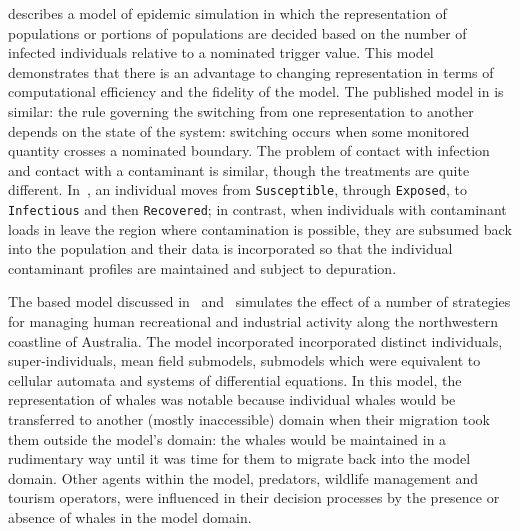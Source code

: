 \Cite{bobashev2007hybrid} describes a model of epidemic simulation in
which the representation of populations or portions of populations are
decided based on the number of infected individuals relative to a
nominated trigger value. This model demonstrates that there is an
advantage to changing representation in terms of computational
efficiency and the fidelity of the model. The published model in
\Ctwo is similar: the rule governing the
switching from one representation to another depends on the state of
the system: switching occurs when some monitored quantity crosses a
nominated boundary. The problem of contact with infection and contact
with a contaminant is similar, though the treatments are quite
different. In~\citet{bobashev2007hybrid}, an individual moves
from \texttt{Susceptible}, through \texttt{Exposed},
to \texttt{Infectious} and then \texttt{Recovered}; in contrast, when
individuals with contaminant loads in \Ctwo
leave the region where contamination is possible, they are subsumed
back into the population and their data is incorporated so that the
individual contaminant profiles are maintained and subject to
depuration.

The \InVitro based model discussed in~\cite{gray2014}
and~\cite{fulton2009crossingscales} simulates the effect of a number
of strategies for managing human recreational and industrial activity
along the northwestern coastline of Australia. The model incorporated
incorporated distinct individuals, super-individuals, mean field
submodels, submodels which were equivalent to cellular automata and
systems of differential equations. In this model, the representation
of whales was notable because individual whales would be transferred
to another (mostly inaccessible) domain when their migration took them
outside the model's domain: the whales would be maintained in a
rudimentary way until it was time for them to migrate back into the
model domain. Other agents within the model, predators, wildlife
management and tourism operators, were influenced in their decision
processes by the presence or absence of whales in the model domain.

